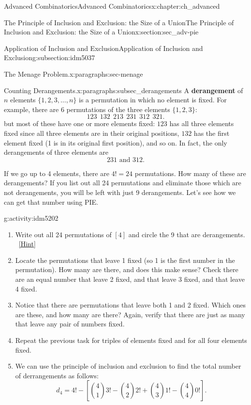 \documentclass[oneside,10pt,]{book}
\newcommand{\terminology}[1]{\textbf{#1}}
\numberwithin{equation}{chapter}
\begin{document}
\begin{chapterptx}{Advanced Combinatorics}{}{Advanced Combinatorics}{}{}{x:chapter:ch_advanced}
\begin{sectionptx}{The Principle of Inclusion and Exclusion: the Size of a Union}{}{The Principle of Inclusion and Exclusion: the Size of a Union}{}{}{x:section:sec_adv-pie}
\begin{subsectionptx}{Application of Inclusion and Exclusion}{}{Application of Inclusion and Exclusion}{}{}{g:subsection:idm5037}
\begin{paragraphs}{The Menage Problem.}{x:paragraphs:sec-menage}
\end{paragraphs}%
\begin{paragraphs}{Counting Derangements.}{x:paragraphs:subsec_derangements}%
A \terminology{derangement} of \(n\) elements \(\{1,2,3,\ldots, n\}\) is a permutation in which no element is fixed. For example, there are \(6\) permutations of the three elements \(\{1,2,3\}\):%
\begin{equation*}
123 ~~ 132 ~~ 213 ~~ 231 ~~ 312 ~~ 321.
\end{equation*}
but most of these have one or more elements fixed: \(123\) has all three elements fixed since all three elements are in their original positions, \(132\) has the first element fixed (1 is in its original first position), and so on. In fact, the only derangements of three elements are%
\begin{equation*}
231 \text{ and } 312.
\end{equation*}
%
\par
If we go up to 4 elements, there are \(4! = 24\) permutations. How many of these are derangements? If you list out all 24 permutations and eliminate those which are not derangements, you will be left with just 9 derangements. Let's see how we can get that number using PIE.%
\begin{activity}{}{g:activity:idm5202}%
\begin{enumerate}[font=\bfseries,label=(\alph*),ref=\alph*]
\item{}Write out all 24 permutations of \([4]\) and circle the 9 that are derangements.%
\qquad~\hfill{\tiny\hyperlink{g:hint:idm5207-back}{[Hint]}}\item{}Locate the permutations that leave 1 fixed (so 1 is the first number in the permutation).  How many are there, and does this make sense?  Check there are an equal number that leave 2 fixed, and that leave 3 fixed, and that leave 4 fixed.%
\item{}Notice that there are permutations that leave both 1 and 2 fixed.  Which ones are these, and how many are there?  Again, verify that there are just as many that leave any pair of numbers fixed.%
\item{}Repeat the previous task for triples of elements fixed and for all four elements fixed.%
\item{}We can use the principle of inclusion and exclusion to find the total number of derrangements as follows:%
\begin{equation*}
d_4 = 4! - \left[{4 \choose 1}3! - {4 \choose 2}2! + {4 \choose 3} 1! - {4 \choose 4}0!\right].

\end{equation*}
\end{enumerate}
\end{activity}
\end{paragraphs}
\end{subsectionptx}
\end{sectionptx}
\end{chapterptx}
\end{document}
